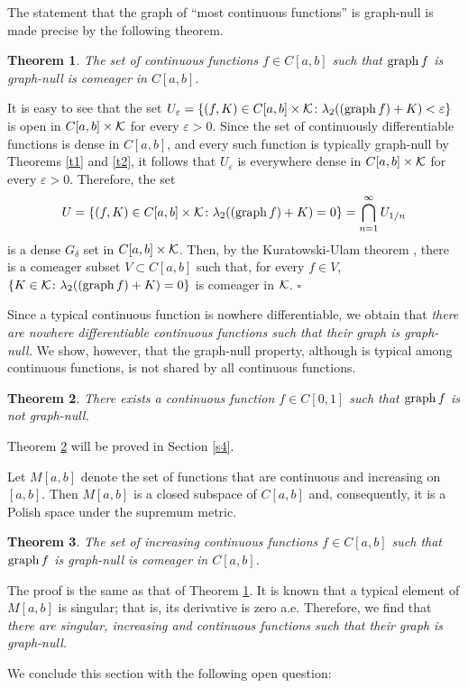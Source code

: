 \documentclass[12pt]{article}
\newtheorem{theorem}{Theorem}[section]
\def\kk{{\cal K}}
\def\su{\subset}
\def\de{\delta}
\def\ep{\varepsilon}
\def\la{\lambda}
\def\nl{[0,1]}
\def\proof{\noindent {\bf Proof.} }
\def\graph{{\rm graph}\, }
\begin{document}
The statement that
the graph of ``most continuous functions'' is graph-null is made precise
by the following theorem.
\begin{theorem}\label{t4}
The set of continuous functions $f\in C[a,b]$ such that $\graph f$ is
graph-null is comeager in $C[a,b]$.
\end{theorem}
\proof
It is easy to see that the set $U_\ep =\{ (f,K)\in C[a,b] \times \kk \colon 
\la _2 ((\graph f)+K)<\ep \}$ is open in $C[a,b] \times \kk$ for every
$\ep >0$. Since the set of continuously differentiable functions is dense in
$C[a,b]$, and every such function is typically graph-null by Theorems \ref{t1}
and \ref{t2}, it follows that $U_\ep$ is everywhere dense in $C[a,b]
\times \kk$ for every $\ep >0$. Therefore, the set
$$U =\{ (f,K)\in C[a,b] \times \kk \colon 
\la _2 ((\graph f)+K)=0 \} =\bigcap_{n=1}^\infty U_{1/n}$$
is a dense $G_\de$ set in $C[a,b] \times \kk$. Then, by the Kuratowski-Ulam
theorem \cite[Theorem 8.41, p. 53]{K}, there is a comeager subset $V\su C[a,b]$
such that, for every $f\in V$, $\{ K\in \kk \colon \la _2 ((\graph f)+K)=0 \}$
is comeager in $\kk$. \hfill $\square$

Since a typical continuous function is nowhere differentiable, we obtain that
{\it there are nowhere differentiable continuous functions such that their
graph is graph-null.} We show, however, that the graph-null property, although
is typical among continuous functions, is not shared by all continuous
functions.
\begin{theorem}\label{t5}
There exists a continuous function $f\in C\nl$ such that $\graph f$
is not graph-null.
\end{theorem}
Theorem \ref{t5} will be proved in Section \ref{s4}.

Let $M[a,b]$ denote the set of functions that are continuous and increasing
on $[a,b]$. Then $M[a,b]$ is a closed subspace of $C[a,b]$ and, consequently,
it is a Polish space under the supremum metric.
\begin{theorem}\label{t6}
The set of increasing continuous functions $f\in C[a,b]$ such that $\graph f$
is graph-null is comeager in $C[a,b]$.
\end{theorem}

The proof is the same as that of Theorem \ref{t4}. It is known that
a typical element of $M[a,b]$ is singular; that is, its derivative is
zero a.e. Therefore, we find that {\it there are singular, increasing and
continuous functions such that their graph is graph-null.}

We conclude this section with the following open question:
\end{document}
